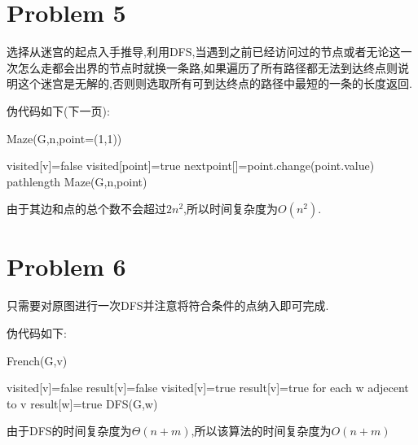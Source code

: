 \documentclass[12pt,a4paper,fontset=none]{ctexart}
\begin{document}
\section{Problem 5}
选择从迷宫的起点入手推导,利用DFS,当遇到之前已经访问过的节点或者无论这一次怎么走都会出界的节点时就换一条路,如果遍历了所有路径都无法到达终点则说明这个迷宫是无解的,否则则选取所有可到达终点的路径中最短的一条的长度返回.

伪代码如下(下一页):
\begin{algorithm}
    \renewcommand{\algorithmicensure}{\textbf{Output:}}
    \renewcommand{\algorithmicrequire}{\textbf{Input:}}
    \caption{Maze(G,n,point=(1,1))}
    \label{alg4}
    \begin{algorithmic}
        \State visited[v]=false
        \EndFor
        \State visited[point]=true
        \State nextpoint[]=point.change(point.value)
        \State \Return pathlength
        \Else {}
        \State Maze(G,n,point)
        \EndIf
        \EndIf
        \EndFor
    \end{algorithmic}
\end{algorithm}

由于其边和点的总个数不会超过$2n^2$,所以时间复杂度为$O(n^2)$.
\section{Problem 6}
只需要对原图进行一次DFS并注意将符合条件的点纳入即可完成.

伪代码如下:
\begin{algorithm}
    \renewcommand{\algorithmicensure}{\textbf{Output:}}
    \renewcommand{\algorithmicrequire}{\textbf{Input:}}
    \caption{French(G,v)}
    \label{alg5}
    \begin{algorithmic}
        \State visited[v]=false
        \State result[v]=false
        \EndFor
        \State visited[v]=true
        \State result[v]=true
        \State for each w adjecent to v
        \State result[w]=true
        \State DFS(G,w)
        \EndIf
        \EndIf
        \EndFunction
    \end{algorithmic}
\end{algorithm}

由于DFS的时间复杂度为$\Theta(n+m)$,所以该算法的时间复杂度为$O(n+m)$
\end{document}
